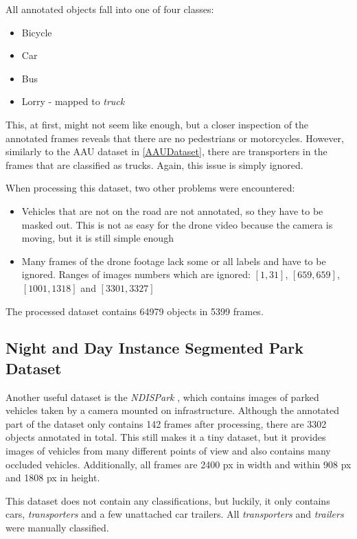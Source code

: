 All annotated objects fall into one of four classes:
\begin{itemize}
    \item Bicycle
    \item Car
    \item Bus
    \item Lorry - mapped to \textit{truck}
\end{itemize}
This, at first, might not seem like enough, but a closer inspection of the
annotated frames reveals that there are no pedestrians or motorcycles. However,
similarly to the AAU dataset in \autoref{AAUDataset}, there are transporters in the frames
that are classified as trucks. Again, this issue is simply ignored.

When processing this dataset, two other problems were encountered:
\begin{itemize}
    \item Vehicles that are not on the road are not annotated, so they have to
    be masked out. This is not as easy for the drone video because the camera is
    moving, but it is still simple enough
    \item Many frames of the drone footage lack some or all labels and have to
    be ignored. Ranges of images numbers which are ignored: $[1,31]$,
    $[659,659]$, $[1001,1318]$ and $[3301,3327]$
\end{itemize}
The processed dataset contains \num{64979} objects in \num{5399} frames.


\subsection*{Night and Day Instance Segmented Park Dataset}

Another useful dataset is the \textit{NDISPark} \cite{Luca2022}, which contains
images of parked vehicles taken by a camera mounted on infrastructure. Although
the annotated part of the dataset only contains \num{142} frames after
processing, there are \num{3302} objects annotated in total. This still makes it
a tiny dataset, but it provides images of vehicles from many different points of
view and also contains many occluded vehicles. 
Additionally, all frames are \num{2400} px in width and within \num{908} px and
\num{1808} px in height.

This dataset does not contain any classifications, but luckily, it only contains
cars, \textit{transporters} and a few unattached car trailers. All
\textit{transporters} and \textit{trailers} were manually classified.


